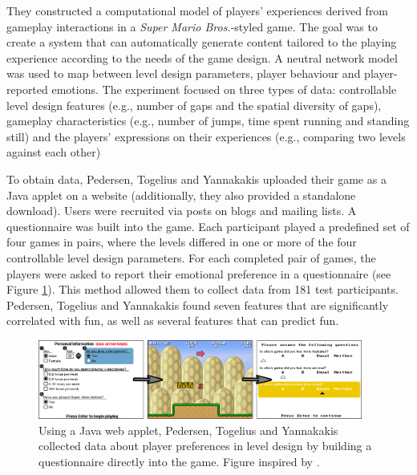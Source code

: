 They constructed a computational model of players' experiences derived from gameplay interactions in a \textit{Super Mario Bros.}-styled game. The goal was to create a system that can automatically generate content tailored to the playing experience according to the needs of the game design.  A neutral network model was used to map between level design parameters, player behaviour and player-reported emotions. The experiment focused on three types of data: controllable level design features (e.g., number of gaps and the spatial diversity of gaps), gameplay characteristics (e.g., number of jumps, time spent running and standing still) and the players' expressions on their experiences (e.g., comparing two levels against each other)

To obtain data, Pedersen, Togelius and Yannakakis uploaded their game as a Java applet on a website (additionally, they also provided a standalone download). Users were recruited via posts on blogs and mailing lists. A questionnaire was built into the game. Each participant played a predefined set of four games in pairs, where the levels differed in one or more of the four controllable level design parameters. For each completed pair of games, the players were asked to report their emotional preference in a questionnaire (see Figure \ref{fig:mario}). This method allowed them to collect data from 181 test participants. Pedersen, Togelius and Yannakakis found seven features that are significantly correlated with fun, as well as several features that can predict fun.


\begin{figure}[htbp]
\centering
\includegraphics[width=0.95\textwidth]{Pics/mario_all2}
\caption{Using a Java web applet, Pedersen, Togelius and Yannakakis collected data about player preferences in level design by building a questionnaire directly into the game. Figure inspired by \cite{marioModel}.}
\label{fig:mario}
\end{figure}

